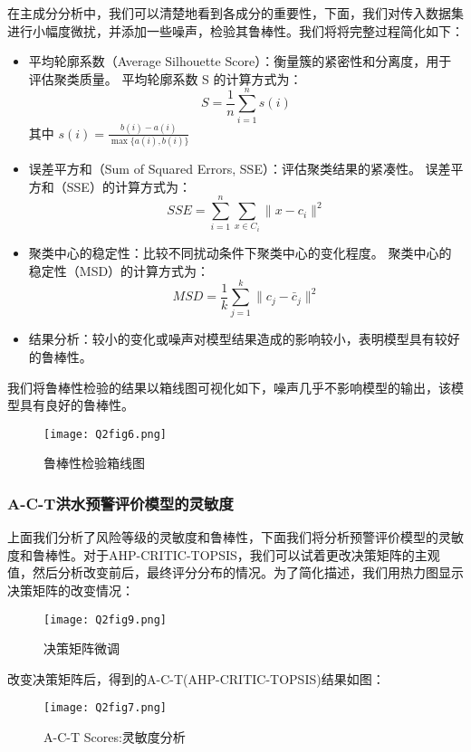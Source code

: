 \documentclass[withoutpreface,bwprint]{cumcmthesis} %
\begin{document}
在主成分分析中，我们可以清楚地看到各成分的重要性，下面，我们对传入数据集进行小幅度微扰，并添加一些噪声，检验其鲁棒性。我们将将完整过程简化如下：
\begin{itemize}
	\item 平均轮廓系数（Average Silhouette Score）：衡量簇的紧密性和分离度，用于评估聚类质量。
	平均轮廓系数 S 的计算方式为：
	\begin{equation}S = \frac{1}{n} \sum_{i=1}^{n} s(i)\end{equation}
	其中 $s(i) = \frac{b(i) - a(i)}{\max\{a(i), b(i)\}}$
	
	\item 误差平方和（Sum of Squared Errors, SSE）：评估聚类结果的紧凑性。
	误差平方和（SSE）的计算方式为：
	\begin{equation}SSE = \sum_{i=1}^{n} \sum_{x \in C_i} \| x - c_i \|^2\end{equation}
	
	\item 聚类中心的稳定性：比较不同扰动条件下聚类中心的变化程度。
	聚类中心的稳定性（MSD）的计算方式为：
	\begin{equation}MSD = \frac{1}{k} \sum_{j=1}^{k} \| c_j - \bar{c}_j \|^2\end{equation}
	
	\item 结果分析：较小的变化或噪声对模型结果造成的影响较小，表明模型具有较好的鲁棒性。
\end{itemize}
我们将鲁棒性检验的结果以箱线图可视化如下，噪声几乎不影响模型的输出，该模型具有良好的鲁棒性。
\begin{figure}[htbp]
	\centering
	\texttt{[image: Q2fig6.png]}
	\caption{鲁棒性检验箱线图}
	\label{Q2fig6.png}
\end{figure}
\newpage
\subsubsection{A-C-T洪水预警评价模型的灵敏度}
上面我们分析了风险等级的灵敏度和鲁棒性，下面我们将分析预警评价模型的灵敏度和鲁棒性。对于AHP-CRITIC-TOPSIS，我们可以试着更改决策矩阵的主观值，然后分析改变前后，最终评分分布的情况。为了简化描述，我们用热力图显示决策矩阵的改变情况：
\begin{figure}[htbp]
	\centering
	\texttt{[image: Q2fig9.png]}
	\caption{决策矩阵微调}
	\label{Q2fig9.png}
\end{figure}

改变决策矩阵后，得到的A-C-T(AHP-CRITIC-TOPSIS)结果如图：
\begin{figure}[htbp]
	\centering
	\texttt{[image: Q2fig7.png]}
	\caption{A-C-T Scores:灵敏度分析}
	\label{Q2fig7.png}
\end{figure}
\end{document}
